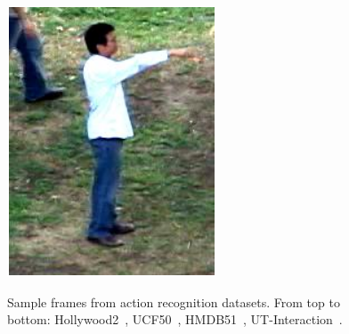 \begin{figure}[!t]
\begin{center}
\includegraphics[scale=0.32]{cvpr14_figures/dataset_thumb/uti/crop_class6.pdf} \\
\smallskip
\caption[Sample frames from action recognition datasets]{Sample frames from action recognition datasets. From top to bottom: Hollywood2~\cite{Marszalek09}, UCF50~\cite{Reddy12}, HMDB51~\cite{Kuehne11}, UT-Interaction~\cite{Ryoo10}.\vspace{-.5cm}}
\label{fig:datasets}
\end{center}
\end{figure}



